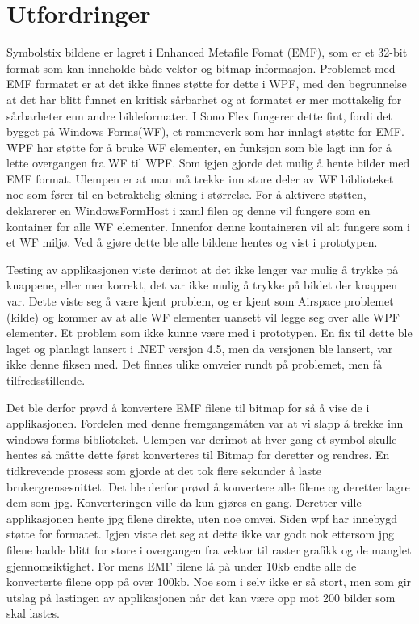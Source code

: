 { 
\section{Utfordringer}

 
Symbolstix bildene er lagret i Enhanced Metafile Fomat (EMF), som er et 32-bit format som kan inneholde både vektor og bitmap informasjon\cite{AboutEMF}. Problemet med EMF formatet er at det ikke finnes støtte for dette i WPF, med den begrunnelse at det har blitt funnet en kritisk sårbarhet\cite{EMFVulnerability} og at formatet er mer mottakelig for sårbarheter\cite{EMFForum} enn andre bildeformater. I Sono Flex fungerer dette fint, fordi det bygget på Windows Forms(WF),  et rammeverk som har innlagt støtte for EMF. WPF har støtte for å bruke WF elementer,  en funksjon som ble lagt inn for å lette overgangen fra WF til WPF. Som igjen gjorde det mulig å hente bilder med EMF format. Ulempen er at man må trekke inn store deler av WF biblioteket noe som fører til en betraktelig økning i størrelse. For å aktivere støtten, deklarerer en WindowsFormHost i xaml filen og denne vil fungere som en kontainer for alle WF elementer. Innenfor denne kontaineren vil alt fungere som i et WF miljø. Ved å gjøre dette ble alle bildene hentes og vist i prototypen.  
 
 
Testing av applikasjonen viste derimot at det ikke lenger var mulig å trykke på knappene, eller mer korrekt, det var ikke mulig å trykke på  bildet der knappen var. Dette viste seg å være kjent problem, og er kjent som Airspace problemet (kilde) og kommer av at alle WF elementer uansett vil legge seg over alle WPF elementer. Et problem som ikke kunne være med i prototypen. En fix til dette ble laget og planlagt lansert i .NET versjon 4.5, men da versjonen ble lansert, var ikke denne fiksen med. Det finnes ulike omveier rundt på problemet, men få tilfredsstillende.  
 
 
Det ble derfor prøvd å konvertere EMF filene til bitmap for så å vise de i applikasjonen. Fordelen med denne fremgangsmåten var at vi slapp å trekke inn windows forms biblioteket. Ulempen var derimot at hver gang et symbol skulle hentes så måtte dette først konverteres til Bitmap for deretter og rendres. En tidkrevende prosess som gjorde at det tok flere sekunder å laste brukergrensesnittet. Det ble derfor prøvd å konvertere alle filene og deretter lagre dem som jpg. Konverteringen ville da kun gjøres en gang. Deretter ville applikasjonen hente jpg filene direkte, uten noe omvei. Siden wpf har innebygd støtte for formatet. Igjen viste det seg at dette ikke var godt nok ettersom jpg filene hadde blitt for store i overgangen fra vektor til raster grafikk og de manglet gjennomsiktighet. For mens EMF filene lå på under 10kb endte alle de konverterte filene opp på over 100kb. Noe som i selv ikke er så stort, men som gir utslag på lastingen av applikasjonen når det kan være opp mot 200 bilder som skal lastes. 
 
}
